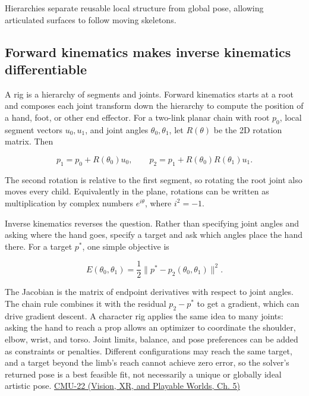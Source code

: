 Hierarchies separate reusable local structure from global pose, allowing articulated surfaces to follow moving skeletons.

\subsection{Forward kinematics makes inverse kinematics differentiable}\label{04-visual-computing-ii-ch029-forward-kinematics-makes-inverse-kinematics-differentiable}

\hypertarget{04-visual-computing-ii-ch029-forward-kinematics-makes-inverse-kinematics-differentiable}{}

A rig is a hierarchy of segments and joints. Forward kinematics starts at a root and composes each joint transform down the hierarchy to compute the position of a hand, foot, or other end effector. For a two-link planar chain with root \(p_0\), local segment vectors \(u_0,u_1\), and joint angles \(\theta_0,\theta_1\), let \(R(\theta)\) be the 2D rotation matrix. Then

\[
p_1=p_0+R(\theta_0)u_0,\qquad
p_2=p_1+R(\theta_0)R(\theta_1)u_1.
\]

The second rotation is relative to the first segment, so rotating the root joint also moves every child. Equivalently in the plane, rotations can be written as multiplication by complex numbers \(e^{i\theta}\), where \(i^2=-1\).

Inverse kinematics reverses the question. Rather than specifying joint angles and asking where the hand goes, specify a target and ask which angles place the hand there. For a target \(p^*\), one simple objective is

\[
E(\theta_0,\theta_1)=\frac12\|p^*-p_2(\theta_0,\theta_1)\|^2.
\]

The Jacobian is the matrix of endpoint derivatives with respect to joint angles. The chain rule combines it with the residual \(p_2-p^*\) to get a gradient, which can drive gradient descent. A character rig applies the same idea to many joints: asking the hand to reach a prop allows an optimizer to coordinate the shoulder, elbow, wrist, and torso. Joint limits, balance, and pose preferences can be added as constraints or penalties. Different configurations may reach the same target, and a target beyond the limb's reach cannot achieve zero error, so the solver's returned pose is a best feasible fit, not necessarily a unique or globally ideal artistic pose. \href{../07-Vision-XR-and-Playable-Worlds/main.pdf\#nameddest=04-visual-computing-ii-ch036-cmu-22---optimization}{CMU-22 (Vision, XR, and Playable Worlds, Ch. 5)}

